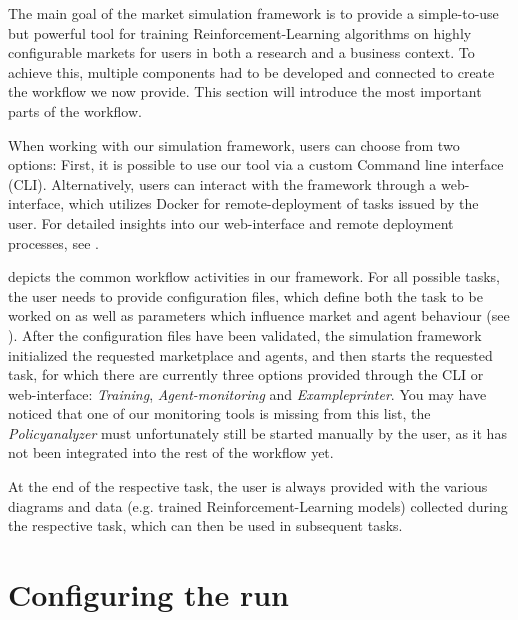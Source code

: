\begin{jointwork}\label{ch:OurWorkflow}
	The main goal of the market simulation framework is to provide a simple-to-use but powerful tool for training Reinforcement-Learning algorithms on highly configurable markets for users in both a research and a business context. To achieve this, multiple components had to be developed and connected to create the workflow we now provide. This section will introduce the most important parts of the workflow.
\end{jointwork}

When working with our simulation framework, users can choose from two options: First, it is possible to use our tool via a custom Command line interface (CLI). Alternatively, users can interact with the framework through a web-interface, which utilizes Docker for remote-deployment of tasks issued by the user. For detailed insights into our web-interface and remote deployment processes, see \cite{JudithThesis}.

 depicts the common workflow activities in our framework. For all possible tasks, the user needs to provide configuration files, which define both the task to be worked on as well as parameters which influence market and agent behaviour (see ). After the configuration files have been validated, the simulation framework initialized the requested marketplace and agents, and then starts the requested task, for which there are currently three options provided through the CLI or web-interface: \emph{Training}, \emph{Agent-monitoring} and \emph{Exampleprinter}. You may have noticed that one of our monitoring tools is missing from this list, the \emph{Policyanalyzer} must unfortunately still be started manually by the user, as it has not been integrated into the rest of the workflow yet.

At the end of the respective task, the user is always provided with the various diagrams and data (e.g. trained Reinforcement-Learning models) collected during the respective task, which can then be used in subsequent tasks.

\section{Configuring the run}\label{sec:ConfigureRun}

